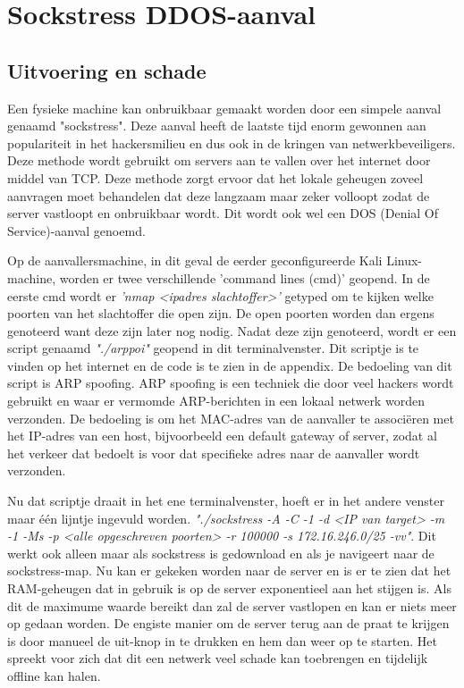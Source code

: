 \documentclass[pdftex,a4paper,12pt]{report}
\begin{document}
\section{Sockstress DDOS-aanval}
\subsection{Uitvoering en schade}
Een fysieke machine kan onbruikbaar gemaakt worden door een simpele aanval genaamd "sockstress". Deze aanval heeft de laatste tijd enorm gewonnen aan populariteit in het hackersmilieu en dus ook in de kringen van netwerkbeveiligers. Deze methode wordt gebruikt om servers aan te vallen over het internet door middel van TCP. Deze methode zorgt ervoor dat het lokale geheugen zoveel aanvragen moet behandelen dat deze langzaam maar zeker volloopt zodat de server vastloopt en onbruikbaar wordt. Dit wordt ook wel een DOS (Denial Of Service)-aanval genoemd. \newline \newline

Op de aanvallersmachine, in dit geval de eerder geconfigureerde Kali Linux-machine, worden er twee verschillende 'command lines (cmd)' geopend. In de eerste cmd wordt er \textit{'nmap <ipadres slachtoffer>'} getyped om te kijken welke poorten van het slachtoffer die open zijn. De open poorten worden dan ergens genoteerd want deze zijn later nog nodig. Nadat deze zijn genoteerd, wordt er een script genaamd \textit{"./arppoi"} geopend in dit terminalvenster. Dit scriptje is te vinden op het internet en de code is te zien in de appendix. De bedoeling van dit script is ARP spoofing. ARP spoofing is een techniek die door veel hackers wordt gebruikt en waar er vermomde ARP-berichten in een lokaal netwerk worden verzonden. De bedoeling is om het MAC-adres van de aanvaller te associëren met het IP-adres van een host, bijvoorbeeld een default gateway of server, zodat al het verkeer dat bedoelt is voor dat specifieke adres naar de aanvaller wordt verzonden. \newline \newline

Nu dat scriptje draait in het ene terminalvenster, hoeft er in het andere venster maar één lijntje ingevuld worden. \textit{"./sockstress -A -C -1 -d <IP van target> -m -1 -Ms -p <alle opgeschreven poorten> -r 100000 -s 172.16.246.0/25 -vv"}. Dit werkt ook alleen maar als sockstress is gedownload en als je navigeert naar de sockstress-map. Nu kan er gekeken worden naar de server en is er te zien dat het RAM-geheugen dat in gebruik is op de server exponentieel aan het stijgen is. Als dit de maximume waarde bereikt dan zal de server vastlopen en kan er niets meer op gedaan worden. De engiste manier om de server terug aan de praat te krijgen is door manueel de uit-knop in te drukken en hem dan weer op te starten. Het spreekt voor zich dat dit een netwerk veel schade kan toebrengen en tijdelijk offline kan halen.
\end{document}
